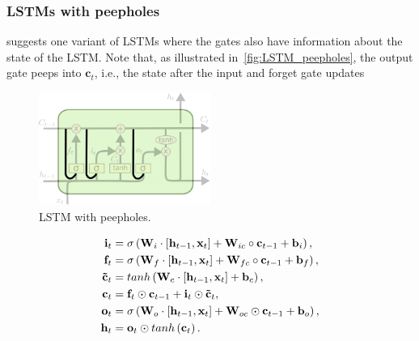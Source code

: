\subsubsection{LSTMs with peepholes}

\cite{gers2000recurrent} suggests one variant of LSTMs where the gates also
have information about the state of the LSTM. Note that, as illustrated
in~\autoref{fig:LSTM_peepholes}, the output gate peeps into $\mathbf{c}_t$,
i.e., the state after the input and forget gate updates

\begin{figure}[t]
    \centering
    \includegraphics[width=0.5\textwidth]{pdf/LSTM_peepholes.pdf}
    \caption{LSTM with peepholes.\label{fig:LSTM_peepholes}}
\end{figure}

\begin{equation}\label{eq:LSTM_peepholes}
\begin{split}
    \mathbf{i}_t &= \sigma\left(\mathbf{W}_i \cdot \left[\mathbf{h}_{t-1},
        \mathbf{x}_t\right] + \mathbf{W}_{ic} \circ \mathbf{c}_{t-1} +
        \mathbf{b}_i \right),\\
    \mathbf{f}_t &= \sigma\left(\mathbf{W}_f \cdot \left[\mathbf{h}_{t-1},
        \mathbf{x}_t\right] + \mathbf{W}_{fc} \circ \mathbf{c}_{t-1} +
        \mathbf{b}_f \right),\\
    \mathbf{\tilde c}_t &= tanh \left(\mathbf{W}_c \cdot
        \left[\mathbf{h}_{t-1}, \mathbf{x}_t\right] + \mathbf{b}_c \right),\\
    \mathbf{c}_t &= \mathbf{f}_t \odot \mathbf{c}_{t-1} + \mathbf{i}_t
        \odot \mathbf{\tilde c}_t,\\
    \mathbf{o}_t &= \sigma\left(\mathbf{W}_o \cdot \left[\mathbf{h}_{t-1},
        \mathbf{x}_t\right] + \mathbf{W}_{oc} \odot \mathbf{c}_{t-1} +
        \mathbf{b}_o \right),\\
    \mathbf{h}_t &= \mathbf{o}_t \odot tanh \left(\mathbf{c}_t\right).
\end{split}
\end{equation}


